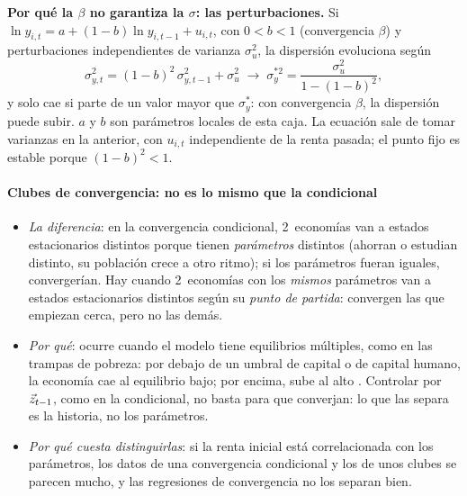 \documentclass[11pt]{article}
\begin{document}
\begin{anotaciones}
\textbf{Por qué la $\beta$ no garantiza la $\sigma$: las perturbaciones.} Si $\ln y_{i,t}=a+(1-b)\ln y_{i,t-1}+u_{i,t}$, con $0<b<1$ (convergencia $\beta$) y perturbaciones independientes de varianza $\sigma_u^2$, la dispersión evoluciona según
\begin{equation}
\sigma_{y,t}^2=(1-b)^2\,\sigma_{y,t-1}^2+\sigma_u^2\;\longrightarrow\;\sigma_y^{*2}=\frac{\sigma_u^2}{1-(1-b)^2},\label{eq:dispersion}
\end{equation}
y solo cae si parte de un valor mayor que $\sigma_y^{*}$: con convergencia $\beta$, la dispersión puede subir\nocite{SalaiMartin1996}. $a$ y $b$ son parámetros locales de esta caja. La ecuación sale de tomar varianzas en la anterior, con $u_{i,t}$ independiente de la renta pasada; el punto fijo es estable porque $(1-b)^2<1$.
\end{anotaciones}

\paragraph{Clubes de convergencia: no es lo mismo que la condicional}

\begin{itemize}
\item \emph{La diferencia}: en la convergencia condicional, 2~economías van a estados estacionarios distintos porque tienen \emph{parámetros} distintos (ahorran o estudian distinto, su población crece a otro ritmo); si los parámetros fueran iguales, convergerían. Hay  cuando 2~economías con los \emph{mismos} parámetros van a estados estacionarios distintos según su \emph{punto de partida}: convergen las que empiezan cerca, pero no las demás\nocite{Galor1996}.
\item \emph{Por qué}: ocurre cuando el modelo tiene equilibrios múltiples, como en las trampas de pobreza: por debajo de un umbral de capital o de capital humano, la economía cae al equilibrio bajo; por encima, sube al alto  . Controlar por $\vec{z}_{t-1}$, como en la condicional, no basta para que converjan: lo que las separa es la historia, no los parámetros.
\item \emph{Por qué cuesta distinguirlas}: si la renta inicial está correlacionada con los parámetros, los datos de una convergencia condicional y los de unos clubes se parecen mucho, y las regresiones de convergencia no los separan bien\nocite{Galor1996,DurlaufJohnson1995}.
\end{itemize}
\end{document}
